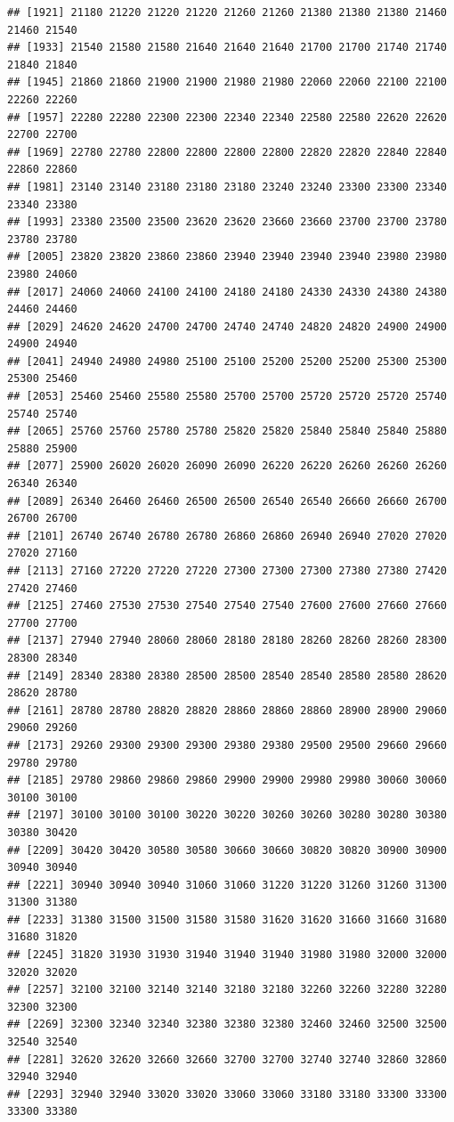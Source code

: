 \documentclass[
  12pt,
]{article}
\begin{document}
\begin{verbatim}
## [1921] 21180 21220 21220 21220 21260 21260 21380 21380 21380 21460 21460 21540
## [1933] 21540 21580 21580 21640 21640 21640 21700 21700 21740 21740 21840 21840
## [1945] 21860 21860 21900 21900 21980 21980 22060 22060 22100 22100 22260 22260
## [1957] 22280 22280 22300 22300 22340 22340 22580 22580 22620 22620 22700 22700
## [1969] 22780 22780 22800 22800 22800 22800 22820 22820 22840 22840 22860 22860
## [1981] 23140 23140 23180 23180 23180 23240 23240 23300 23300 23340 23340 23380
## [1993] 23380 23500 23500 23620 23620 23660 23660 23700 23700 23780 23780 23780
## [2005] 23820 23820 23860 23860 23940 23940 23940 23940 23980 23980 23980 24060
## [2017] 24060 24060 24100 24100 24180 24180 24330 24330 24380 24380 24460 24460
## [2029] 24620 24620 24700 24700 24740 24740 24820 24820 24900 24900 24900 24940
## [2041] 24940 24980 24980 25100 25100 25200 25200 25200 25300 25300 25300 25460
## [2053] 25460 25460 25580 25580 25700 25700 25720 25720 25720 25740 25740 25740
## [2065] 25760 25760 25780 25780 25820 25820 25840 25840 25840 25880 25880 25900
## [2077] 25900 26020 26020 26090 26090 26220 26220 26260 26260 26260 26340 26340
## [2089] 26340 26460 26460 26500 26500 26540 26540 26660 26660 26700 26700 26700
## [2101] 26740 26740 26780 26780 26860 26860 26940 26940 27020 27020 27020 27160
## [2113] 27160 27220 27220 27220 27300 27300 27300 27380 27380 27420 27420 27460
## [2125] 27460 27530 27530 27540 27540 27540 27600 27600 27660 27660 27700 27700
## [2137] 27940 27940 28060 28060 28180 28180 28260 28260 28260 28300 28300 28340
## [2149] 28340 28380 28380 28500 28500 28540 28540 28580 28580 28620 28620 28780
## [2161] 28780 28780 28820 28820 28860 28860 28860 28900 28900 29060 29060 29260
## [2173] 29260 29300 29300 29300 29380 29380 29500 29500 29660 29660 29780 29780
## [2185] 29780 29860 29860 29860 29900 29900 29980 29980 30060 30060 30100 30100
## [2197] 30100 30100 30100 30220 30220 30260 30260 30280 30280 30380 30380 30420
## [2209] 30420 30420 30580 30580 30660 30660 30820 30820 30900 30900 30940 30940
## [2221] 30940 30940 30940 31060 31060 31220 31220 31260 31260 31300 31300 31380
## [2233] 31380 31500 31500 31580 31580 31620 31620 31660 31660 31680 31680 31820
## [2245] 31820 31930 31930 31940 31940 31940 31980 31980 32000 32000 32020 32020
## [2257] 32100 32100 32140 32140 32180 32180 32260 32260 32280 32280 32300 32300
## [2269] 32300 32340 32340 32380 32380 32380 32460 32460 32500 32500 32540 32540
## [2281] 32620 32620 32660 32660 32700 32700 32740 32740 32860 32860 32940 32940
## [2293] 32940 32940 33020 33020 33060 33060 33180 33180 33300 33300 33300 33380

\end{verbatim}
\end{document}
